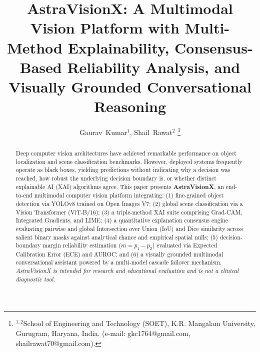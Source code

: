 \documentclass[journal,10pt,twocolumn]{IEEEtran}
\begin{document}
\title{AstraVisionX: A Multimodal Vision Platform with Multi-Method Explainability, Consensus-Based Reliability Analysis, and Visually Grounded Conversational Reasoning}

\author{Gaurav~Kumar$^1$,
        Shail~Rawat$^2$
\thanks{$^{1,2}$School of Engineering and Technology (SOET), K.R. Mangalam University, Gurugram, Haryana, India. (e-mail: gkc1764@gmail.com, shailrawat70@gmail.com).}}


\maketitle

\begin{abstract}
Deep computer vision architectures have achieved remarkable performance on object localization and scene classification benchmarks. However, deployed systems frequently operate as black boxes, yielding predictions without indicating why a decision was reached, how robust the underlying decision boundary is, or whether distinct explainable AI (XAI) algorithms agree. This paper presents \textbf{AstraVisionX}, an end-to-end multimodal computer vision platform integrating: (1) fine-grained object detection via YOLOv8 trained on Open Images V7; (2) global scene classification via a Vision Transformer (ViT-B/16); (3) a triple-method XAI suite comprising Grad-CAM, Integrated Gradients, and LIME; (4) a quantitative explanation consensus engine evaluating pairwise and global Intersection over Union (IoU) and Dice similarity across salient binary masks against analytical chance and empirical spatial nulls; (5) decision-boundary margin reliability estimation ($m = p_1 - p_2$) evaluated via Expected Calibration Error (ECE) and AUROC; and (6) a visually grounded multimodal conversational assistant powered by a multi-model cascade failover mechanism. \textit{AstraVisionX is intended for research and educational evaluation and is not a clinical diagnostic tool.}


\end{abstract}
\end{document}
